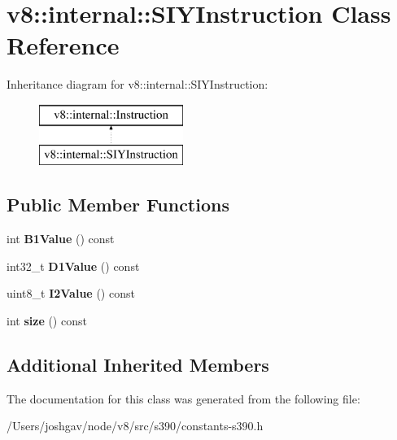 \hypertarget{classv8_1_1internal_1_1_s_i_y_instruction}{}\section{v8\+:\+:internal\+:\+:S\+I\+Y\+Instruction Class Reference}
\label{classv8_1_1internal_1_1_s_i_y_instruction}
Inheritance diagram for v8\+:\+:internal\+:\+:S\+I\+Y\+Instruction\+:\begin{figure}[H]
\begin{center}
\leavevmode
\includegraphics[height=2.000000cm]{classv8_1_1internal_1_1_s_i_y_instruction}
\end{center}
\end{figure}
\subsection*{Public Member Functions}
\begin{DoxyCompactItemize}
\item 
int {\bfseries B1\+Value} () const \hypertarget{classv8_1_1internal_1_1_s_i_y_instruction_abf5e70219156c6eb31b49333366bcde6}{}\label{classv8_1_1internal_1_1_s_i_y_instruction_abf5e70219156c6eb31b49333366bcde6}

\item 
int32\+\_\+t {\bfseries D1\+Value} () const \hypertarget{classv8_1_1internal_1_1_s_i_y_instruction_a82a866a24e2ae05a9fa4087029175a15}{}\label{classv8_1_1internal_1_1_s_i_y_instruction_a82a866a24e2ae05a9fa4087029175a15}

\item 
uint8\+\_\+t {\bfseries I2\+Value} () const \hypertarget{classv8_1_1internal_1_1_s_i_y_instruction_a358d1ad0eab4789da5a8c2656c4469fe}{}\label{classv8_1_1internal_1_1_s_i_y_instruction_a358d1ad0eab4789da5a8c2656c4469fe}

\item 
int {\bfseries size} () const \hypertarget{classv8_1_1internal_1_1_s_i_y_instruction_ad16ae26eeb4ea7501ea00e479098eba7}{}\label{classv8_1_1internal_1_1_s_i_y_instruction_ad16ae26eeb4ea7501ea00e479098eba7}

\end{DoxyCompactItemize}
\subsection*{Additional Inherited Members}


The documentation for this class was generated from the following file\+:\begin{DoxyCompactItemize}
\item 
/\+Users/joshgav/node/v8/src/s390/constants-\/s390.\+h\end{DoxyCompactItemize}
